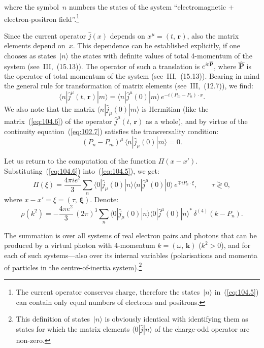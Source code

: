 
\noindent where the symbol~$n$ numbers the states of the system ``electromagnetic $+$ electron-positron field''.\footnote{The current operator conserves charge, therefore the states~$|n\rangle$ in~(\ref{eq:104.5}) can contain only equal numbers of electrons and positrons.}

Since the current operator $\hat{j}(x)$ depends on $x^\mu = (t,\,\mathbf{r})$, also the matrix elements depend on~$x$. This dependence can be established explicitly, if one chooses as states~$|n\rangle$ the states with definite values of total 4-momentum of the system (see~III,~(15.13)). The operator of such a translation is $e^{i\mathbf{r}\hat{\mathbf{P}}}$, where $\hat{\mathbf{P}}$ is the operator of total momentum of the system (see~III,~(15.13)). Bearing in mind the general rule for transformation of matrix elements (see~III,~(12.7)), we find:
\begin{equation}
\langle n|\hat{j}^\mu(t,\,\mathbf{r})|m\rangle = \langle n|\hat{j}^\mu(0)|m\rangle\,e^{-i(P_m - P_n)\cdot x}.
\label{eq:104.6}
\end{equation}
We also note that the matrix $\langle n|\hat{j}_\mu(0)|m\rangle$ is Hermitian (like the matrix~(\ref{eq:104.6}) of the operator $\hat{j}^\mu(t,\,\mathbf{r})$ as a whole), and by virtue of the continuity equation~(\ref{eq:102.7}) satisfies the transversality condition:
\begin{equation}
(P_n - P_m)^\mu\,\langle n|\hat{j}_\mu(0)|m\rangle = 0.
\label{eq:104.7}
\end{equation}

Let us return to the computation of the function $\Pi(x - x')$. Substituting~(\ref{eq:104.6}) into~(\ref{eq:104.5}), we get:
\begin{equation}
\Pi(\xi) = \frac{4\pi i e^2}{3}\sum_n \langle 0|\hat{j}_\mu(0)|n\rangle\langle n|\hat{j}^\mu(0)|0\rangle\,e^{\mp i P_n \cdot \xi}, \qquad \tau \gtrless 0,
\label{eq:104.8}
\end{equation}
where $x - x' = \xi = (\tau,\,\boldsymbol{\xi})$. Denote:
\begin{equation}
\rho(k^2) = -\frac{4\pi e^2}{3}\,(2\pi)^3 \sum_n \langle 0|\hat{j}_\mu(0)|n\rangle\langle 0|\hat{j}^\mu(0)|n\rangle^*\,\delta^{(4)}(k - P_n).
\label{eq:104.9}
\end{equation}


The summation is over all systems of real electron pairs and photons that can be produced by a virtual photon with 4-momentum $k = (\omega,\,\mathbf{k})$ ($k^2 > 0$), and for each of such systems---also over its internal variables (polarisations and momenta of particles in the centre-of-inertia system).\footnote{This definition of states~$|n\rangle$ is obviously identical with identifying them as states for which the matrix elements $\langle 0|\hat{j}|n\rangle$ of the charge-odd operator are non-zero.}

